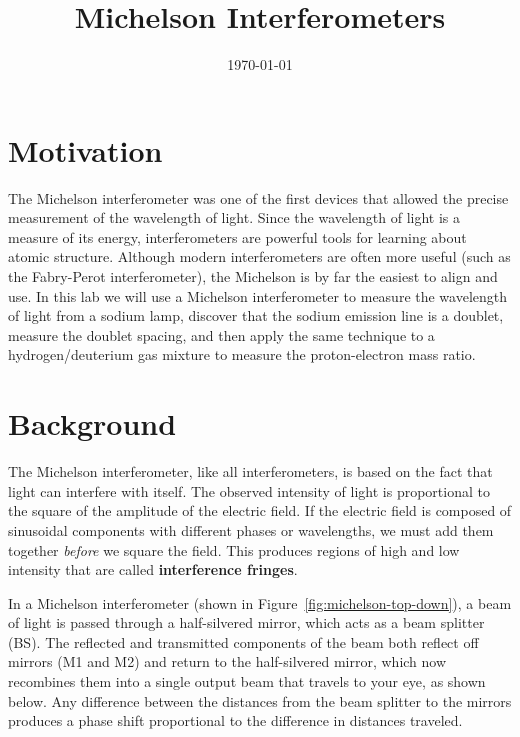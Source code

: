 \documentclass[]{manual}
\title{Michelson Interferometers}
\date{\today}
\begin{document}
    \maketitle
    \thispagestyle{firstpage}


    \section{Motivation}

    The Michelson interferometer was one of the first devices that allowed the precise measurement of the wavelength of light.
    Since the wavelength of light is a measure of its energy, interferometers are powerful tools for learning about atomic structure.
    Although modern interferometers are often more useful (such as the Fabry-Perot interferometer), the Michelson is by far the easiest to align and use.
    In this lab we will use a Michelson interferometer to measure the wavelength of light from a sodium lamp, discover that the sodium emission line is a doublet, measure the doublet spacing, and then apply the same technique to a hydrogen/deuterium gas mixture to measure the proton-electron mass ratio.

    \section{Background}

    The Michelson interferometer, like all interferometers, is based on the fact that light can interfere with itself.
    The observed intensity of light is proportional to the square of the amplitude of the electric field.
    If the electric field is composed of sinusoidal components with different phases or wavelengths, we must add them together \textit{before} we square the field.
    This produces regions of high and low intensity that are called \textbf{interference fringes}.

    In a Michelson interferometer (shown in Figure~\ref{fig:michelson-top-down}), a beam of light is passed through a half-silvered mirror, which acts as a beam splitter (BS).
    The reflected and transmitted components of the beam both reflect off mirrors (M1 and M2) and return to the half-silvered mirror, which now recombines them into a single output beam that travels to your eye, as shown below.
    Any difference between the distances from the beam splitter to the mirrors produces a phase shift proportional to the difference in distances traveled.
\end{document}

